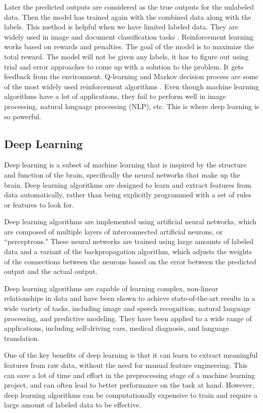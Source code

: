 \documentclass{book}
\begin{document}
	Later the predicted outputs are considered as the true outputs for the unlabeled data. Then the model has trained again with the combined data along with the labels. This method is helpful when we have limited labeled data. They are widely used in image and document classification tasks \cite{yoon2017semi}. Reinforcement learning works based on rewards and penalties. The goal of the model is to maximize the total reward. The model will not be given any labels, it has to figure out using trial and error approaches to come up with a solution to the problem. It gets feedback from the environment. Q-learning and Markov decision process are some of the most widely used reinforcement algorithms \cite{sutton2018reinforcement}.
	Even though machine learning algorithms have a lot of applications, they fail to perform well in image processing, natural language processing (NLP), etc. This is where deep learning is so powerful.
	
	\subsection{Deep Learning}
	Deep learning is a subset of machine learning that is inspired by the structure and function of the brain, specifically the neural networks that make up the brain. Deep learning algorithms are designed to learn and extract features from data automatically, rather than being explicitly programmed with a set of rules or features to look for.
	
	Deep learning algorithms are implemented using artificial neural networks, which are composed of multiple layers of interconnected artificial neurons, or ``perceptrons." These neural networks are trained using large amounts of labeled data and a variant of the backpropagation algorithm, which adjusts the weights of the connections between the neurons based on the error between the predicted output and the actual output.
	
	Deep learning algorithms are capable of learning complex, non-linear relationships in data and have been shown to achieve state-of-the-art results in a wide variety of tasks, including image and speech recognition, natural language processing, and predictive modeling. They have been applied to a wide range of applications, including self-driving cars, medical diagnosis, and language translation.
	
	One of the key benefits of deep learning is that it can learn to extract meaningful features from raw data, without the need for manual feature engineering. This can save a lot of time and effort in the preprocessing stage of a machine learning project, and can often lead to better performance on the task at hand. However, deep learning algorithms can be computationally expensive to train and require a large amount of labeled data to be effective.
	
\end{document}
